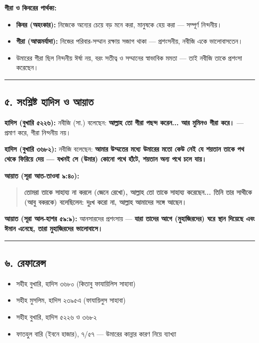 \textbf{গীরা ও কিবরের পার্থক্য:}
\begin{itemize}
\item \textbf{কিবর (অহংকার):} নিজেকে অন্যের চেয়ে বড় মনে করা, মানুষকে হেয় করা — সম্পূর্ণ নিন্দনীয়।
\item \textbf{গীরা (আত্মমর্যাদা):} নিজের পরিবার-সম্মান রক্ষায় সজাগ থাকা — প্রশংসনীয়, নবীজি একে ভালোবাসতেন।
\item উমারের গীরা ছিল নিন্দনীয় ঈর্ষা নয়, বরং সতীত্ব ও সম্মানের স্বাভাবিক মমতা — তাই নবীজি তাকে প্রশংসা করেছেন।
\end{itemize}
\medskip\hrule\medskip

\subsection*{৫. সংশ্লিষ্ট হাদিস ও আয়াত}

\textbf{হাদিস (বুখারি ৫২২৬):} নবীজি (সা.) বলেছেন: \textbf{আল্লাহ তো গীরা পছন্দ করেন... আর মুমিনও গীরা করে।} — প্রমাণ করে, গীরা নিন্দনীয় নয়।

\textbf{হাদিস (বুখারি ৩৬৮২):} নবীজি বলেছেন: \textbf{আমার উম্মতের মধ্যে উমারের মতো কেউ নেই যে শয়তান তাকে পথ থেকে ফিরিয়ে দেয় — যখনই সে (উমার) কোনো পথে হাঁটে, শয়তান অন্য পথে চলে যায়।}

\textbf{আয়াত (সূরা আত-তাওবা ৯:৪০):}
\begin{quote}
\textbf{তোমরা তাকে সাহায্য না করলে (জেনে রেখো), আল্লাহ তো তাকে সাহায্য করেছেন... তিনি তার সাথীকে (আবু বকরকে) বলেছিলেন: দুঃখ করো না, আল্লাহ আমাদের সঙ্গে আছেন।}
\end{quote}

\textbf{আয়াত (সূরা আল-হাশর ৫৯:৯):} আনসারদের প্রশংসায় — \textbf{যারা তাদের আগে (মুহাজিরদের) ঘরে স্থান দিয়েছে এবং ঈমান এনেছে, তারা মুহাজিরদের ভালোবাসে।}

\medskip\hrule\medskip

\subsection*{৬. রেফারেন্স}

\begin{itemize}
\item সহীহ বুখারি, হাদিস ৩৬৮০ (কিতাবু ফাযায়িলিস সাহাবা)
\item সহীহ মুসলিম, হাদিস ২৩৯৫এ (ফাযায়িলুস সাহাবা)
\item সহীহ বুখারি, হাদিস ৫২২৬ ও ৩৬৮২
\item ফাতহুল বারি (ইবনে হাজার), ৭/৫৭ — উমারের কান্নার কারণ নিয়ে ব্যাখ্যা
\end{itemize}


